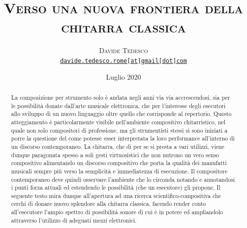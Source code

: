 \documentclass[oneside]{article}
\title{\vspace{-15mm}\fontsize{24pt}{10pt}\selectfont\textsf{\bfseries{\textsc{Verso una nuova frontiera della
 chitarra classica}}}} %
\author{
\large
\textsc{Davide Tedesco}\\
\small \href{mailto:enter_adress_here}{\texttt{davide.tedesco.rome[at]gmail[dot]com}} 
}
\date{Luglio 2020}
\begin{document}
\maketitle %

\tableofcontents

\thispagestyle{empty} 

\vspace*{10mm}

\begin{abstract}

La composizione per strumento solo è andata negli anni via via accrescendosi, sia per le possibilità donate dall'arte musicale elettronica, che per l'interesse degli esecutori allo sviluppo di un nuovo linguaggio oltre quello che corrisponde al repertorio. Questo atteggiamento è particolarmente visibile nell'ambiente compositivo chitarristico, nel quale non solo compositori di professione, ma gli strumentisti stessi si sono iniziati a porre la questione del come potesse esser interpretata la loro performance all'interno di un discorso contemporaneo. La chitarra, che di per se si presta a vari utilizzi, viene dunque paragonata spesso a soli gesti virtuosistici che non nutrono un vero senso compositivo alimentando un discorso compositivo che porta la qualità dei manufatti musicali sempre più verso la semplicità e immediatezza di esecuzione. Il compositore contemporaneo deve quindi osservare l'ambiente che lo circonda notando e annotandosi i punti forza attuali ed estendendo le possibilità (che un esecutore) gli propone, Il seguente testo mira dunque all'apertura ad una ricerca scientifico-compositiva che cerchi di donare nuovo splendore alla chitarra classica, facendo render conto all'esecutore l'ampio spettro di possibilità sonore di cui è in potere ed ampliandolo attraverso l'utilizzo di adeguati mezzi elettronici.

\vspace*{4mm}
\end{abstract}

\hspace*{4mm}
\end{document}
